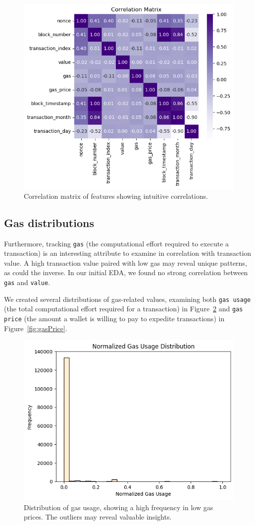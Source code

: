 \documentclass[sigconf]{acmart}
\begin{document}
\begin{figure}[h]
    \centering
    \includegraphics[width=0.8\linewidth]{m4-correlation-matrix.png}
    \caption{Correlation matrix of features showing intuitive correlations.}
    \label{fig:m4CorrelationMatrix}
\end{figure}



\subsection{Gas distributions}
Furthermore, tracking \texttt{gas} (the computational effort required to execute a transaction) is an interesting attribute to examine in correlation with transaction value. A high transaction value paired with low gas may reveal unique patterns, as could the inverse. In our initial EDA, we found no strong correlation between \texttt{gas} and \texttt{value}.

We created several distributions of gas-related values, examining both \texttt{gas usage} (the total computational effort required for a transaction) in Figure~\ref{fig:gasUsage} and \texttt{gas price} (the amount a wallet is willing to pay to expedite transactions) in Figure~\ref{fig:gasPrice}.

\begin{figure}[H]
    \centering
    \includegraphics[width=0.8\linewidth]{M4-normalized-distro-gas.png}
    \caption{Distribution of gas usage, showing a high frequency in low gas prices. The outliers may reveal valuable insights.}
    \label{fig:gasUsage}
\end{figure}
\end{document}
